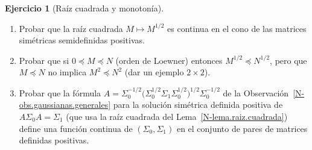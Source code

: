 \documentclass[11pt,a4paper]{amsart}
\newcounter{chapter}
\theoremstyle{remark}
\theoremstyle{definition}
\newtheorem{ejercicio}{Ejercicio}[chapter]
\numberwithin{subsection}{section}
\numberwithin{equation}{section}
\begin{document}
\begin{ejercicio}[Raíz cuadrada y monotonía]\label{ejer.FP.raiz}
\leavevmode
\begin{enumerate}[label=(\alph*)]
\item Probar que la raíz cuadrada $M\mapsto M^{1/2}$ es continua en el cono
de las matrices simétricas semidefinidas positivas.
\item Probar que si $0\preceq M\preceq N$ (orden de Loewner) entonces
$M^{1/2}\preceq N^{1/2}$, pero que $M\preceq N$ no implica $M^2\preceq N^2$
(dar un ejemplo $2\times2$).
\item Probar que la fórmula
$A=\Sigma_0^{-1/2}\bigl(\Sigma_0^{1/2}\Sigma_1\Sigma_0^{1/2}\bigr)^{1/2}\Sigma_0^{-1/2}$
de la Observación~\ref{N-obs.gaussianas.generales} para la solución simétrica
definida positiva de $A\Sigma_0A=\Sigma_1$ (que usa la raíz cuadrada del
Lema~\ref{N-lema.raiz.cuadrada}) define una función continua de
$(\Sigma_0,\Sigma_1)$ en el conjunto de pares de matrices definidas
positivas.
\end{enumerate}
\end{ejercicio}
\end{document}
